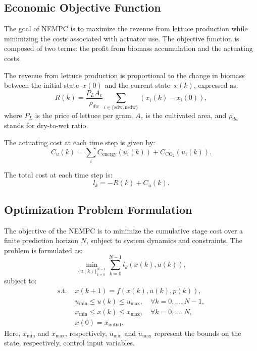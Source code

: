 \documentclass[conference]{IEEEtran}
\newcommand{\coo}{\ensuremath{\mathrm{CO_2}}}
\begin{document}
\subsection{Economic Objective Function}\label{subsec:mpc_objective}
The goal of NEMPC is to maximize the revenue from lettuce production while minimizing the costs associated with actuator use. The objective function is composed of two terms: the profit from biomass accumulation and the actuating costs.

The revenue from lettuce production is proportional to the change in biomass between the initial state~\(x(0)\) and the current state~\(x(k)\), expressed as:
\begin{equation}
    R(k) = \frac{P_L A_c}{\rho_{dw}} \textstyle\sum_{i\in \{ \text{sdw}, \text{nsdw} \}}(x_i(k) - x_i(0)),
\end{equation}
where \(P_L\) is the price of lettuce per gram, \(A_c\) is the cultivated area, and \(\rho_{dw}\) stands for dry-to-wet ratio.

The actuating cost at each time step is given by:
\begin{equation}
    C_u(k) = \textstyle\sum_{i} C_{\text{energy}}(u_i(k)) + C_{\coo}(u_i(k)).
\end{equation}

The total cost at each time step is:
\begin{equation}
    l_k = -R(k) + C_u(k).
\end{equation}

\subsection{Optimization Problem Formulation}
The objective of the NEMPC is to minimize the cumulative stage cost over a finite prediction horizon \(N\), subject to system dynamics and constraints. The problem is formulated as:
\begin{equation}
    \min_{{\{u(k)\}}_{k=0}^{N-1}} \sum_{k=0}^{N-1} l_k(x(k), u(k)),
\end{equation}
subject to:
\begin{align}
    \text{s.t. } & x(k+1) = f(x(k), u(k), p(k)),                                      \\
                 & u_{\min} \leq u(k) \leq u_{\max}, \quad \forall k = 0, \dots, N-1, \\
                 & x_{\min} \leq x(k) \leq x_{\max}, \quad \forall k = 0, \dots, N,   \\
                 & x(0) = x_{\text{initial}}.
\end{align}
Here, \(x_{\min}\) and \(x_{\max}\), respectively, \(u_{\min}\) and \(u_{\max}\) represent the bounds on the state, respectively, control input variables.
\end{document}
